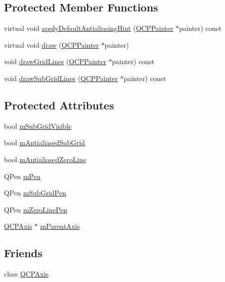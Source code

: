 \subsection*{Protected Member Functions}
\begin{DoxyCompactItemize}
\item 
virtual void \hyperlink{class_q_c_p_grid_a9916f5e38b4d6cae446537aeb47c7272}{apply\+Default\+Antialiasing\+Hint} (\hyperlink{class_q_c_p_painter}{Q\+C\+P\+Painter} $\ast$painter) const 
\item 
virtual void \hyperlink{class_q_c_p_grid_ad009c23f96078616aa4f66a750974b23}{draw} (\hyperlink{class_q_c_p_painter}{Q\+C\+P\+Painter} $\ast$painter)
\item 
void \hyperlink{class_q_c_p_grid_a3aff10e993f6625e255c19e4f97a09d8}{draw\+Grid\+Lines} (\hyperlink{class_q_c_p_painter}{Q\+C\+P\+Painter} $\ast$painter) const 
\item 
void \hyperlink{class_q_c_p_grid_afa5d9d12de419e881f381f2ab7cb414d}{draw\+Sub\+Grid\+Lines} (\hyperlink{class_q_c_p_painter}{Q\+C\+P\+Painter} $\ast$painter) const 
\end{DoxyCompactItemize}
\subsection*{Protected Attributes}
\begin{DoxyCompactItemize}
\item 
bool \hyperlink{class_q_c_p_grid_a4e4a0400d6319bb44c06341f6298c87b}{m\+Sub\+Grid\+Visible}
\item 
bool \hyperlink{class_q_c_p_grid_a71b7051f833f0c5de3094998d6afdd87}{m\+Antialiased\+Sub\+Grid}
\item 
bool \hyperlink{class_q_c_p_grid_a8c0df56ae86440408c050895dcdb922b}{m\+Antialiased\+Zero\+Line}
\item 
Q\+Pen \hyperlink{class_q_c_p_grid_a1cdc4a3bccf6a40c2d4360def9fefa40}{m\+Pen}
\item 
Q\+Pen \hyperlink{class_q_c_p_grid_aa9004bc139ad3ea92629f0aaae81d83f}{m\+Sub\+Grid\+Pen}
\item 
Q\+Pen \hyperlink{class_q_c_p_grid_a379481871f17655c27eda30af233554f}{m\+Zero\+Line\+Pen}
\item 
\hyperlink{class_q_c_p_axis}{Q\+C\+P\+Axis} $\ast$ \hyperlink{class_q_c_p_grid_a9a8a76731e6e737b65b929fd1995cc88}{m\+Parent\+Axis}
\end{DoxyCompactItemize}
\subsection*{Friends}
\begin{DoxyCompactItemize}
\item 
class \hyperlink{class_q_c_p_grid_af123edeca169ec7a31958a1d714e1a8a}{Q\+C\+P\+Axis}
\end{DoxyCompactItemize}
